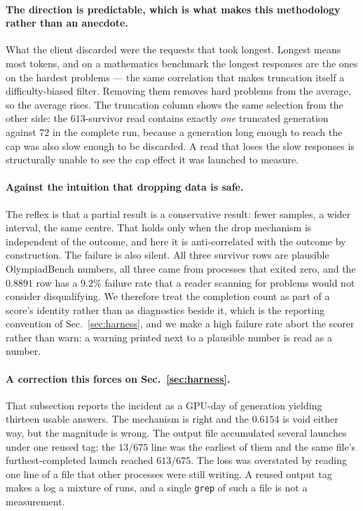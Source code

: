 \paragraph{The direction is predictable, which is what makes this methodology rather than an
anecdote.} What the client discarded were the requests that took longest. Longest means most
tokens, and on a mathematics benchmark the longest responses are the ones on the hardest
problems --- the same correlation that makes truncation itself a difficulty-biased filter.
Removing them removes hard problems from the average, so the average rises. The truncation
column shows the same selection from the other side: the $613$-survivor read contains exactly
\emph{one} truncated generation against $72$ in the complete run, because a generation long
enough to reach the cap was also slow enough to be discarded. A read that loses the slow
responses is structurally unable to see the cap effect it was launched to measure.

\paragraph{Against the intuition that dropping data is safe.} The reflex is that a partial
result is a conservative result: fewer samples, a wider interval, the same centre. That holds
only when the drop mechanism is independent of the outcome, and here it is anti-correlated
with the outcome by construction. The failure is also silent. All three survivor rows are
plausible OlympiadBench numbers, all three came from processes that exited zero, and the
$0.8891$ row has a $9.2\%$ failure rate that a reader scanning for problems would not
consider disqualifying. We therefore treat the completion count as part of a score's
identity rather than as diagnostics beside it, which is the reporting convention of
Sec.~\ref{sec:harness}, and we make a high failure rate abort the scorer rather than warn:
a warning printed next to a plausible number is read as a number.

\paragraph{A correction this forces on Sec.~\ref{sec:harness}.} That subsection reports the
incident as a GPU-day of generation yielding thirteen usable answers. The mechanism is right
and the $0.6154$ is void either way, but the magnitude is wrong. The output file accumulated
several launches under one reused tag; the $13/675$ line was the earliest of them and the
same file's furthest-completed launch reached $613/675$. The loss was overstated by reading
one line of a file that other processes were still writing. A reused output tag makes a log a
mixture of runs, and a single \texttt{grep} of such a file is not a measurement.

